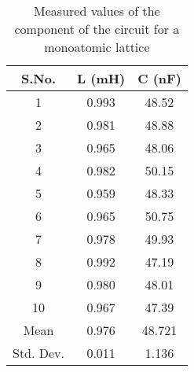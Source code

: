 \begin{table}[]
    \centering
    \begin{tabular}{|c|c|c|}
    \hline
    S.No. & L (mH) & C (nF) \\ \hline
    1 & 0.993 & 48.52 \\ 
    2 & 0.981 & 48.88 \\ 
    3 & 0.965 & 48.06 \\ 
    4 & 0.982 & 50.15 \\ 
    5 & 0.959 & 48.33 \\ 
    6 & 0.965 & 50.75 \\ 
    7 & 0.978 & 49.93 \\ 
    8 & 0.992 & 47.19 \\ 
    9 & 0.980 & 48.01 \\ 
    10 & 0.967 & 47.39 \\ \hline
    Mean & 0.976 & 48.721 \\ \hline
    Std. Dev. & 0.011 & 1.136 \\ \hline
    \end{tabular}
    \caption{Measured values of the component of the circuit for a monoatomic lattice}
    \label{tab:mono}
    \end{table}